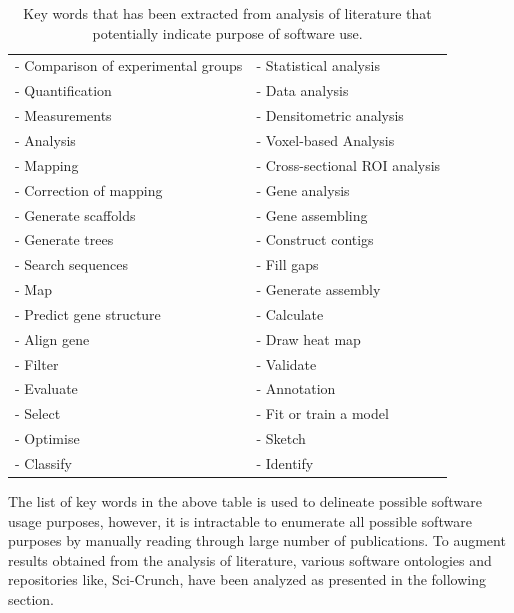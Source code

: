 \begin{table}[h!]
	\begin{center}
		\caption{Key words that has been extracted from analysis of literature that potentially indicate purpose of software use.}
		\label{tab:table1}
		\begin{tabular}{|l|l|} %
			
			\hline
			- Comparison of experimental groups & -	Statistical analysis  \\
			- Quantification & - Data analysis \\
			- Measurements   & - Densitometric analysis \\
			- Analysis       & - Voxel-based Analysis  \\
			- Mapping        & - Cross-sectional ROI analysis \\
			- Correction of mapping  & - Gene analysis     \\
			- Generate scaffolds     & - Gene assembling \\
			- Generate trees         & - Construct contigs \\
			- Search sequences       & - Fill gaps \\
			- Map                    & - Generate assembly \\
			- Predict gene structure & - Calculate \\
			- Align gene             & - Draw heat map \\
			- Filter                 & - Validate \\
			- Evaluate               & - Annotation \\
			- Select                 & - Fit or train a model \\ 
			- Optimise               & - Sketch \\
			- Classify               & - Identify \\
			
			\hline
		\end{tabular}
	\end{center}
\end{table}

The list of key words in the above table is used to delineate possible software usage purposes, however, it is intractable to enumerate all possible software purposes by manually reading through large number of publications. To augment results obtained from the analysis of literature, various software ontologies and repositories like, Sci-Crunch, have been analyzed as presented in the following section. 


